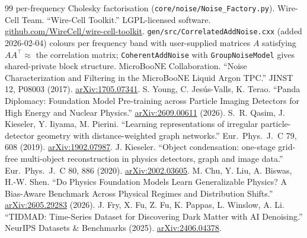 \documentclass[10pt,twocolumn]{extarticle}
\begin{document}
\begin{thebibliography}{99}
per-frequency Cholesky factorisation (\texttt{core/noise/Noise\_Factory.py}).
 Wire-Cell Team. ``Wire-Cell Toolkit.'' LGPL-licensed
software. \href{https://github.com/WireCell/wire-cell-toolkit}{github.com/WireCell/wire-cell-toolkit}.
\texttt{gen/src/CorrelatedAddNoise.cxx} (added 2026-02-04) colours per frequency
band with user-supplied matrices $A$ satisfying $AA^{\top}\approx$ the
correlation matrix; \texttt{CoherentAddNoise} with \texttt{GroupNoiseModel}
gives shared-private block structure.
 MicroBooNE Collaboration. ``Noise
Characterization and Filtering in the MicroBooNE Liquid Argon TPC.''
JINST 12, P08003 (2017).
\href{https://arxiv.org/abs/1705.07341}{arXiv:1705.07341}.
 S. Young, C. Jes\'us-Valls, K. Terao. ``Panda Diplomacy:
Foundation Model Pre-training across Particle Imaging Detectors for High
Energy and Nuclear Physics.''
\href{https://arxiv.org/abs/2609.00611}{arXiv:2609.00611} (2026).
 S.~R. Qasim, J. Kieseler, Y. Iiyama, M. Pierini.
``Learning representations of irregular particle-detector geometry with
distance-weighted graph networks.'' Eur.\ Phys.\ J.\ C 79, 608 (2019).
\href{https://arxiv.org/abs/1902.07987}{arXiv:1902.07987}.
 J. Kieseler. ``Object condensation: one-stage grid-free
multi-object reconstruction in physics detectors, graph and image data.''
Eur.\ Phys.\ J.\ C 80, 886 (2020).
\href{https://arxiv.org/abs/2002.03605}{arXiv:2002.03605}.
 M. Chu, Y. Liu, A. Biswas, H.-W. Shen. ``Do Physics Foundation Models Learn Generalizable Physics?
A Bias-Aware Benchmark Across Physical Regimes and Distribution Shifts.''
\href{https://arxiv.org/abs/2605.29283}{arXiv:2605.29283} (2026).
 J. Fry, X. Fu, Z. Fu, K. Pappas, L. Winslow, A. Li.
``TIDMAD: Time-Series Dataset for Discovering Dark Matter with AI Denoising.''
NeurIPS Datasets \& Benchmarks (2025).
\href{https://arxiv.org/abs/2406.04378}{arXiv:2406.04378}.
\end{thebibliography}
\end{document}
